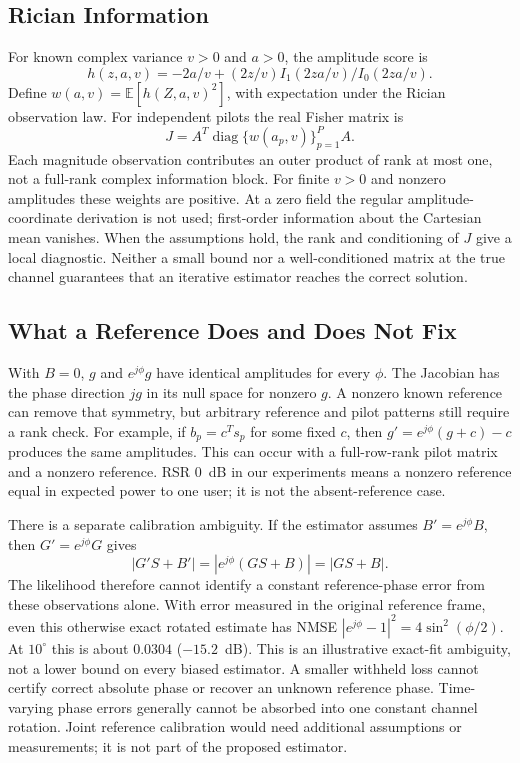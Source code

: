\documentclass[journal]{IEEEtran}
\DeclareMathOperator{\diag}{diag}
\begin{document}
\subsection{Rician Information}
For known complex variance $v>0$ and $a>0$, the amplitude score is
\begin{equation}
 h(z,a,v)=-2a/v+(2z/v)I_1(2za/v)/I_0(2za/v).
\end{equation}
Define $w(a,v)=\mathbb E[h(Z,a,v)^2]$, with expectation under the
Rician observation law. For independent pilots the real Fisher matrix is
\begin{equation}
 J=A^T\diag\{w(a_p,v)\}_{p=1}^P A.
\end{equation}
Each magnitude observation contributes an outer product of rank at most one, not a
full-rank complex information block. For finite $v>0$ and nonzero
amplitudes these weights are positive. At a zero field the regular
amplitude-coordinate derivation is not used; first-order information
about the Cartesian mean vanishes. When the assumptions hold, the
rank and conditioning of $J$ give a local diagnostic. Neither a small
bound nor a well-conditioned matrix at the true channel guarantees that
an iterative estimator reaches the correct solution.

\subsection{What a Reference Does and Does Not Fix}
With $B=0$, $g$ and $e^{j\phi}g$ have identical amplitudes for every
$\phi$. The Jacobian has the phase direction $jg$ in its null space for
nonzero $g$. A nonzero known reference can remove that symmetry, but
arbitrary reference and pilot patterns still require a rank check. For
example, if $b_p=c^Ts_p$ for some fixed $c$, then
$g'=e^{j\phi}(g+c)-c$ produces the same amplitudes. This can occur
with a full-row-rank pilot matrix and a nonzero reference.
RSR $0$~dB in our experiments means a nonzero reference equal in expected
power to one user; it is not the absent-reference case.

There is a separate calibration ambiguity. If the estimator assumes
$B'=e^{j\phi}B$, then $G'=e^{j\phi}G$ gives
\begin{equation}
 |G'S+B'|=|e^{j\phi}(GS+B)|=|GS+B|.
\end{equation}
The likelihood therefore cannot identify a constant reference-phase error
from these observations alone. With error measured in the original
reference frame, even this otherwise exact rotated estimate has NMSE
$|e^{j\phi}-1|^2=4\sin^2(\phi/2)$. At $10^\circ$ this is about
$0.0304$ ($-15.2$~dB). This is an illustrative exact-fit ambiguity, not
a lower bound on every biased estimator. A smaller withheld loss cannot
certify correct absolute phase or recover an unknown reference phase.
Time-varying phase errors generally cannot be absorbed into one constant
channel rotation. Joint reference calibration would need additional
assumptions or measurements; it is not part of the proposed estimator.
\end{document}
